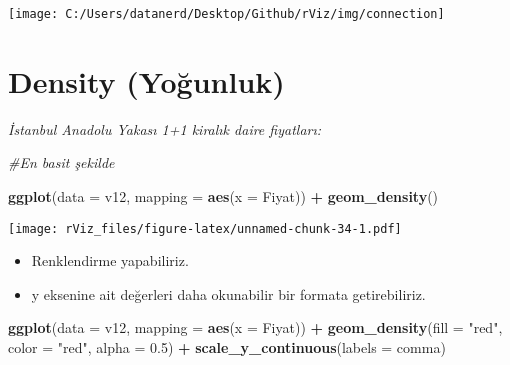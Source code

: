 \documentclass[
]{book}
\newenvironment{Shaded}{\begin{snugshade}}{\end{snugshade}}
\newcommand{\CommentTok}[1]{\textcolor[rgb]{0.56,0.35,0.01}{\textit{#1}}}
\newcommand{\DataTypeTok}[1]{\textcolor[rgb]{0.13,0.29,0.53}{#1}}
\newcommand{\DecValTok}[1]{\textcolor[rgb]{0.00,0.00,0.81}{#1}}
\newcommand{\FloatTok}[1]{\textcolor[rgb]{0.00,0.00,0.81}{#1}}
\newcommand{\KeywordTok}[1]{\textcolor[rgb]{0.13,0.29,0.53}{\textbf{#1}}}
\newcommand{\NormalTok}[1]{#1}
\newcommand{\OperatorTok}[1]{\textcolor[rgb]{0.81,0.36,0.00}{\textbf{#1}}}
\newcommand{\StringTok}[1]{\textcolor[rgb]{0.31,0.60,0.02}{#1}}
\begin{document}
\begin{Shaded}
\end{Shaded}

\texttt{[image: C:/Users/datanerd/Desktop/Github/rViz/img/connection]}

\hypertarget{density-youx11funluk}{%
\section{Density (Yoğunluk)}\label{density-youx11funluk}}

\emph{İstanbul Anadolu Yakası 1+1 kiralık daire fiyatları:}

\begin{Shaded}
\begin{Highlighting}[]
\CommentTok{#En basit şekilde}

\KeywordTok{ggplot}\NormalTok{(}\DataTypeTok{data =}\NormalTok{ v12, }\DataTypeTok{mapping =} \KeywordTok{aes}\NormalTok{(}\DataTypeTok{x =}\NormalTok{ Fiyat)) }\OperatorTok{+}
\StringTok{  }\KeywordTok{geom_density}\NormalTok{()}
\end{Highlighting}
\end{Shaded}

\texttt{[image: rViz\_files/figure-latex/unnamed-chunk-34-1.pdf]}

\begin{itemize}
\item
  Renklendirme yapabiliriz.
\item
  y eksenine ait değerleri daha okunabilir bir formata getirebiliriz.
\end{itemize}

\begin{Shaded}
\begin{Highlighting}[]
\KeywordTok{ggplot}\NormalTok{(}\DataTypeTok{data =}\NormalTok{ v12, }\DataTypeTok{mapping =} \KeywordTok{aes}\NormalTok{(}\DataTypeTok{x =}\NormalTok{ Fiyat)) }\OperatorTok{+}
\StringTok{  }\KeywordTok{geom_density}\NormalTok{(}\DataTypeTok{fill =} \StringTok{"red"}\NormalTok{, }\DataTypeTok{color =} \StringTok{"red"}\NormalTok{, }\DataTypeTok{alpha =} \FloatTok{0.5}\NormalTok{) }\OperatorTok{+}
\StringTok{  }\KeywordTok{scale_y_continuous}\NormalTok{(}\DataTypeTok{labels =}\NormalTok{ comma)}
\end{Highlighting}
\end{Shaded}
\end{document}
